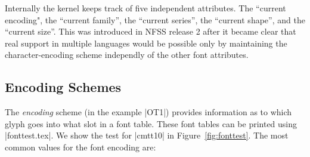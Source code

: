 Internally the \latex kernel keeps track of five independent attributes. The ``current encoding",
the ``current family'', the ``current series'', the ``current shape'', and the ``current size''. This was introduced in NFSS release 2 after it became clear that real support in multiple languages would be possible only by maintaining the character-encoding scheme independly of the
other font attributes.


\subsection{Encoding Schemes}

The \textit{encoding} scheme (in the example |OT1|) provides information as to which glyph goes into what slot in a font table. These font tables can be printed using |fonttest.tex|. We show the test for |cmtt10| in Figure~\ref{fig:fonttest}. The
most common values for the font encoding are:
\medskip

